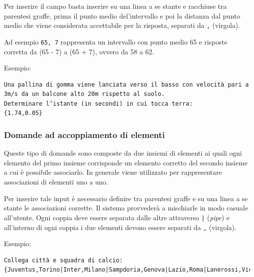 \documentclass[12pt,a4paper]{article}
\begin{document}
\par Per inserire il campo basta inserire su una linea a se stante e racchiuse tra parentesi graffe, prima il punto medio del'intervallo e poi la distanza dal punto medio che viene considerata accettabile per la risposta, separati da \texttt{,} (virgola). \\

\par Ad esempio \texttt{{65, 7}} rappresenta un intervallo con punto medio 65 e risposte corretta da (65 - 7) a (65 + 7), ovvero da 58 a 62. \\

\par Esempio: \\
\begin{verbatim}
Una pallina di gomma viene lanciata verso il basso con velocità pari a 
3m/s da un balcone alto 20m rispetto al suolo. 
Determinare l’istante (in secondi) in cui tocca terra:
{1.74,0.05}
\end{verbatim}

\subsubsection{Domande ad accoppiamento di elementi}

\par Queste tipo di domande sono composte da due insiemi di elementi ai quali ogni elemento del primo insieme corrisponde un elemento corretto del secondo insieme a cui è possibile associarlo. In generale viene utilizzato per rappresentare associazioni di elementi uno a uno. \\

\par Per inserire tale input è necessario definire tra parentesi graffe e su una linea a se stante le associazioni corrette. Il sistema provvederà a mischiarle in modo casuale all'utente. Ogni coppia deve essere separata dalle altre attraverso \texttt{|} (\textit{pipe}) e all'interno di ogni coppia i due elementi devono essere separati da \texttt{,} (virgola). \\

\par Esempio: \\
\begin{verbatim}
Collega città e squadra di calcio:
{Juventus,Torino|Inter,Milano|Sampdoria,Genova|Lazio,Roma|Lanerossi,Vicenza}
\end{verbatim}

\newpage
\end{document}
